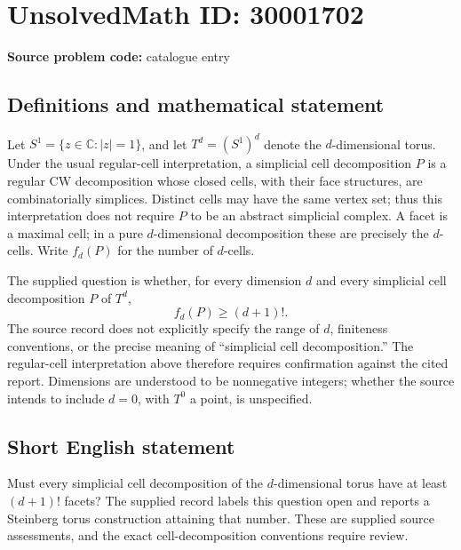 \documentclass[11pt]{article}
\newcommand{\C}{\mathbb{C}}
\begin{document}
\section*{UnsolvedMath ID: 30001702}
\textbf{Source problem code:} catalogue entry
\subsection{Definitions and mathematical statement}
Let \(S^1=\{z\in\C:|z|=1\}\), and let \(T^d=(S^1)^d\) denote the \(d\)-dimensional torus. Under the usual regular-cell interpretation, a simplicial cell decomposition \(P\) is a regular CW decomposition whose closed cells, with their face structures, are combinatorially simplices. Distinct cells may have the same vertex set; thus this interpretation does not require \(P\) to be an abstract simplicial complex. A facet is a maximal cell; in a pure \(d\)-dimensional decomposition these are precisely the \(d\)-cells. Write \(f_d(P)\) for the number of \(d\)-cells.

The supplied question is whether, for every dimension \(d\) and every simplicial cell decomposition \(P\) of \(T^d\),
\[
 f_d(P)\geq (d+1)!.
\]
The source record does not explicitly specify the range of \(d\), finiteness conventions, or the precise meaning of ``simplicial cell decomposition.'' The regular-cell interpretation above therefore requires confirmation against the cited report. Dimensions are understood to be nonnegative integers; whether the source intends to include \(d=0\), with \(T^0\) a point, is unspecified.
\subsection{Short English statement}
Must every simplicial cell decomposition of the \(d\)-dimensional torus have at least \((d+1)!\) facets? The supplied record labels this question open and reports a Steinberg torus construction attaining that number. These are supplied source assessments, and the exact cell-decomposition conventions require review.
\end{document}
